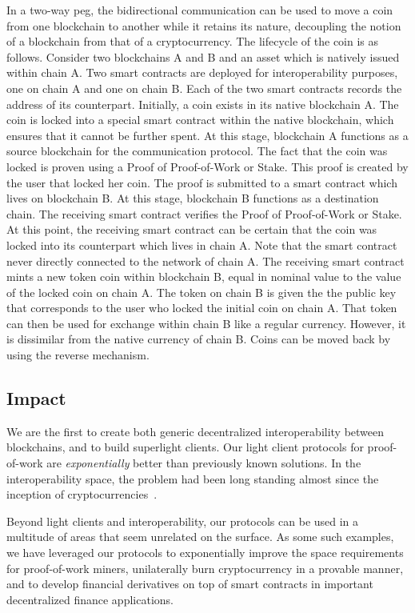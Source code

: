 In a two-way peg, the bidirectional communication can be used to move a coin
from one blockchain to another while it retains its nature, decoupling the
notion of a blockchain from that of a cryptocurrency. The lifecycle of the coin
is as follows. Consider two blockchains A and B and an asset which is natively
issued within chain A. Two smart contracts are deployed for interoperability
purposes, one on chain A and one on chain B. Each of the two smart contracts
records the address of its counterpart. Initially, a coin exists in its native
blockchain A. The coin is locked into a special smart contract within the native
blockchain, which ensures that it cannot be further spent. At this stage,
blockchain A functions as a source blockchain for the communication protocol.
The fact that the coin was locked is proven using a Proof of Proof-of-Work or
Stake. This proof
is created by the user that locked her coin. The proof is submitted to a smart
contract which lives on blockchain B. At this stage, blockchain B functions as a
destination chain. The receiving smart contract verifies the Proof of Proof-of-Work
or Stake. At this point, the receiving smart
contract can be certain that the coin was locked into its counterpart which
lives in chain A. Note that the smart contract never directly connected to the
network of chain A. The receiving smart contract mints a new token coin within
blockchain B, equal in nominal value to the value of the locked coin on chain A.
The token on chain B is given the the public key that corresponds to the user
who locked the initial coin on chain A. That token can then be used for exchange
within chain B like a regular currency. However, it is dissimilar from the
native currency of chain B.
Coins can be moved back by using the reverse mechanism.

\subsection{Impact}
We are the first to create both generic decentralized interoperability between
blockchains, and to build superlight clients. Our light client protocols for
proof-of-work are \emph{exponentially} better than previously known solutions.
In the interoperability space, the problem had been long standing almost
since the inception of cryptocurrencies~\cite{sidechains}.

Beyond light clients and interoperability, our protocols can be used in
a multitude of areas that seem unrelated on the surface. As some such examples,
we have leveraged our protocols to
exponentially improve the space requirements for proof-of-work miners,
unilaterally burn cryptocurrency in a provable manner, and to develop financial derivatives
on top of smart contracts in important decentralized finance applications.

